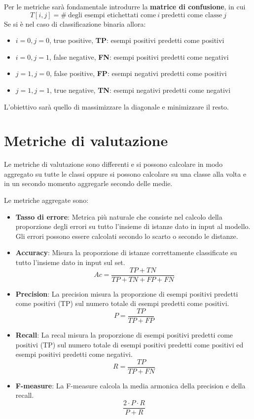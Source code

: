 Per le metriche sarà fondamentale introdurre la \textbf{matrice di confusione}, in cui 
\begin{equation}
    T[i,j] = \# \ \text{degli esempi etichettati come} \ i \ \text{predetti come classe} \ j
\end{equation}
Se si è nel caso di classificazione binaria allora:
\begin{itemize}
    \item $i=0, j=0$, true positive, \textbf{TP}: esempi positivi predetti come positivi
    \item $i=0, j=1$, false negative, \textbf{FN}: esempi positivi predetti come negativi
    \item $j=1, j=0$, false positive, \textbf{FP}: esempi negativi predetti come positivi
    \item $j=1, j=1$, true negative, \textbf{TN}: esempi negativi predetti come negativi 
\end{itemize}
L'obiettivo sarà quello di massimizzare la diagonale e minimizzare il resto.
\section{Metriche di valutazione}
Le metriche di valutazione sono differenti e si possono calcolare in modo aggregato
su tutte le classi oppure si possono calcolare su una classe alla volta e in un 
secondo momento aggregarle secondo delle medie.

Le metriche aggregate sono:
\begin{itemize}
    \item \textbf{Tasso di errore}:
    Metrica più naturale che consiste nel calcolo della proporzione degli errori su 
    tutto l'insieme di istanze dato in input al modello. Gli errori possono essere 
    calcolati secondo lo scarto o secondo le distanze.
    \item \textbf{Accuracy}:
    Misura la proporzione di istanze correttamente classificate su tutto l'insieme
    dato in input sul set.
    \begin{equation}
        Ac = \frac{TP+TN}{TP+TN+FP+FN}
    \end{equation}
    \item \textbf{Precision}:
    La precision misura la proporzione di esempi positivi predetti come positivi (TP)
    sul numero totale di esempi predetti come positivi.
    \begin{equation}
        P=\frac{TP}{TP+FP}
    \end{equation}
    \item \textbf{Recall}:
    La recal misura la proporzione di esempi positivi predetti come positivi (TP) sul
    numero totale di esempi positivi predetti come positivi ed esempi positivi predetti
    come negativi.
    \begin{equation}
        R=\frac{TP}{TP+FN}
    \end{equation}
    \item \textbf{F-measure}:
    La F-measure calcola la media armonica della precision e della recall.
    \begin{equation}
        \frac{2\cdot P\cdot R}{P+R}
    \end{equation}
\end{itemize}

